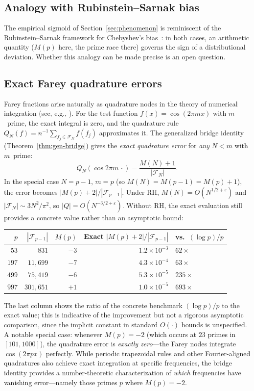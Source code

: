\documentclass[11pt]{article}
\theoremstyle{definition}
\newcommand{\F}{\mathcal{F}}
\begin{document}
\subsection{Analogy with Rubinstein--Sarnak bias}

The empirical sigmoid of Section~\ref{sec:phenomenon} is
reminiscent of the Rubinstein--Sarnak framework for Chebyshev's
bias~\cite{RubinsteinSarnak1994}: in both cases, an arithmetic
quantity ($M(p)$ here, the prime race there) governs the sign of
a distributional deviation.  Whether this analogy can be made
precise is an open question.

\subsection{Exact Farey quadrature errors}

Farey fractions arise naturally as quadrature nodes in the
theory of numerical integration (see, e.g.,
\cite{Niederreiter1992}).  For the test function $f(x) = \cos(2\pi mx)$
with $m$~prime, the exact integral is zero, and the quadrature
rule $Q_N(f) = n^{-1}\sum_{f_j \in \F_N} f(f_j)$ approximates it.
The generalized bridge identity (Theorem~\ref{thm:gen-bridge})
gives the \emph{exact quadrature error} for \emph{any} $N < m$
with $m$~prime:
\[
  Q_N(\cos 2\pi m\,\cdot)
  = \frac{M(N) + 1}{|\F_N|}.
\]
In the special case $N = p-1$, $m = p$ (so $M(N) = M(p-1) = M(p)+1$),
the error becomes $|M(p)+2|/|\F_{p-1}|$.  Under RH,
$M(N) = O(N^{1/2+\varepsilon})$ and $|\F_N| \sim 3N^2/\pi^2$,
so $|Q| = O(N^{-3/2+\varepsilon})$.  Without RH, the exact evaluation
still provides a concrete value rather than an asymptotic bound:

\begin{center}
\begin{tabular}{rrrrl}
\toprule
$p$ & $|\F_{p-1}|$ & $M(p)$ & Exact $|M(p)+2|/|\F_{p-1}|$ & vs.\ $(\log p)/p$ \\
\midrule
$53$ & $831$ & $-3$ & $1.2 \times 10^{-3}$ & $62\times$ \\
$197$ & $11{,}699$ & $-7$ & $4.3 \times 10^{-4}$ & $63\times$ \\
$499$ & $75{,}419$ & $-6$ & $5.3 \times 10^{-5}$ & $235\times$ \\
$997$ & $301{,}651$ & $+1$ & $1.0 \times 10^{-5}$ & $693\times$ \\
\bottomrule
\end{tabular}
\end{center}

\noindent The last column shows the ratio of the
concrete benchmark $(\log p)/p$ to the exact value;
this is indicative of the improvement but not a rigorous
asymptotic comparison, since the implicit constant in
standard $O(\cdot)$ bounds is unspecified.
A notable special case: whenever $M(p) = -2$
(which occurs at $23$ primes in $[101, 1000]$), the quadrature
error is \emph{exactly zero}---the Farey nodes integrate
$\cos(2\pi px)$ perfectly.  While periodic trapezoidal rules
and other Fourier-aligned quadratures also achieve exact integration
at specific frequencies, the bridge identity provides a number-theoretic
characterization of \emph{which} frequencies have vanishing error---namely
those primes $p$ where $M(p) = -2$.
\end{document}
